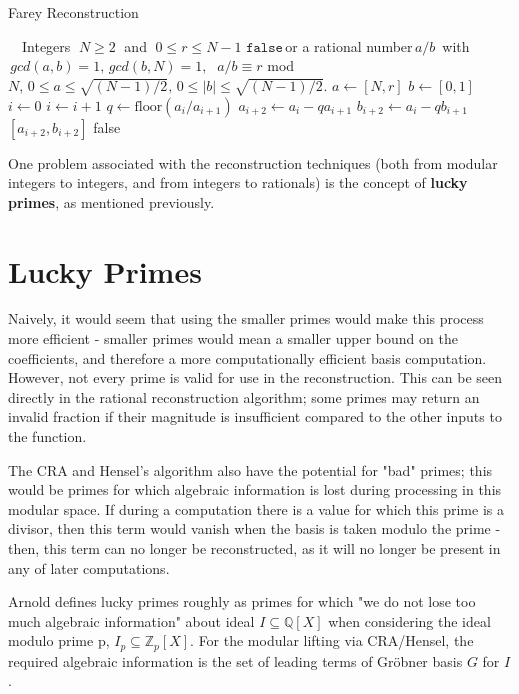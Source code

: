 \documentclass[letterpaper,12pt,titlepage,oneside,final]{book}
\newcommand\abs[1]{\left|#1\right|}
\begin{document}
\begin{algorithm}[H]
\caption{Farey Reconstruction}\label{farey}
\begin{algorithmic}[1]
\Input $\quad$Integers $\; N \geq 2 \;$ and $\; 0 \leq r \leq N - 1$
\Output $\texttt{false} \,$or a rational number$\, a/b \,$ with$\, gcd(a, b) = 1,\, gcd(b, N) = 1,$ $\; a/b \equiv r $ mod $ N, \, 0 \leq a \leq \sqrt{(N-1)/2}, \, 0 \leq \abs{b} \leq \sqrt{(N-1)/2}.$ 
\State $a \gets [ N, r]$
\State $b \gets [ 0, 1]$
\State $i \gets 0$
  \State $i \gets i + 1$
  \State $q \gets \text{floor}( a_i / a_{i+1})$
  \State $a_{i+2} \gets a_i - qa_{i+1}$
  \State $b_{i+2} \gets a_i - qb_{i+1}$
\EndWhile\\  
  \State \quad \Return $[ a_{i+2}, b_{i+2}]$
\Else 
  \State \quad \Return false
\EndIf
\EndProcedure
\end{algorithmic}
\end{algorithm}

One problem associated with the reconstruction techniques (both from modular integers to integers, and from integers to rationals) is the concept of \textbf{lucky primes}, as mentioned previously.    

\section{Lucky Primes}

Naively, it would seem that using the smaller primes would make this process more efficient - smaller primes would mean a smaller upper bound on the coefficients, and therefore a more computationally efficient basis computation.  However, not every prime is valid for use in the reconstruction.  This can be seen directly in the rational reconstruction algorithm; some primes may return an invalid fraction if their magnitude is insufficient compared to the other inputs to the function.  

The CRA and Hensel's algorithm also have the potential for "bad" primes; this would be primes for which algebraic information is lost during processing in this modular space.  If during a computation there is a value for which this prime is a divisor, then this term would vanish when the basis is taken modulo the prime - then, this term can no longer be reconstructed, as it will no longer be present in any of later computations.

Arnold defines lucky primes roughly as primes for which "we do not lose too much algebraic information" \cite{Arnold} about ideal ${I \subseteq \mathbb{Q}[X]}$ when considering the ideal modulo prime p, ${I_p \subseteq \mathbb{Z}_p[X]}$.  For the modular lifting via CRA/Hensel, the required algebraic information is the set of leading terms of Gr\"obner basis ${G}$ for ${I}$.
\end{document}
